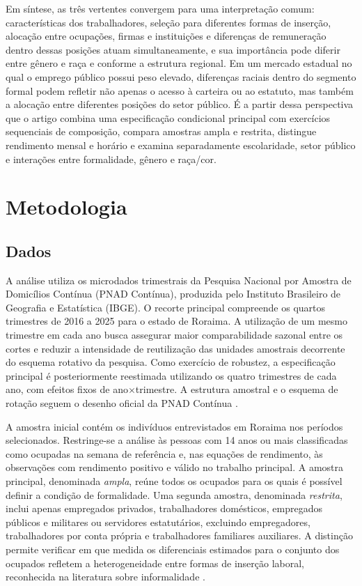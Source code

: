 \documentclass[12pt,a4paper]{article}
\begin{document}
Em síntese, as três vertentes convergem para uma interpretação comum: características
dos trabalhadores, seleção para diferentes formas de inserção, alocação entre ocupações,
firmas e instituições e diferenças de remuneração dentro dessas posições atuam
simultaneamente, e sua importância pode diferir entre gênero e raça e conforme a
estrutura regional. Em um mercado estadual no qual o emprego público possui peso elevado,
diferenças raciais dentro do segmento formal podem refletir não apenas o acesso à carteira
ou ao estatuto, mas também a alocação entre diferentes posições do setor público. É a
partir dessa perspectiva que o artigo combina uma especificação condicional principal com
exercícios sequenciais de composição, compara amostras ampla e restrita, distingue
rendimento mensal e horário e examina separadamente escolaridade, setor público e
interações entre formalidade, gênero e raça/cor.

\section{Metodologia}
\label{sec:metodologia}

\subsection{Dados}
\label{subsec:dados}

A análise utiliza os microdados trimestrais da Pesquisa Nacional por Amostra de
Domicílios Contínua (PNAD Contínua), produzida pelo Instituto Brasileiro de
Geografia e Estatística (IBGE). O recorte principal compreende os quartos
trimestres de 2016 a 2025 para o estado de Roraima. A utilização de um mesmo
trimestre em cada ano busca assegurar maior comparabilidade sazonal entre os
cortes e reduzir a intensidade de reutilização das unidades amostrais decorrente
do esquema rotativo da pesquisa. Como exercício de robustez, a especificação
principal é posteriormente reestimada utilizando os quatro trimestres de
cada ano, com efeitos fixos de ano$\times$trimestre. A estrutura amostral e o
esquema de rotação seguem o desenho oficial da PNAD Contínua
\citep{ibge_pnadc_notas_metodologicas}.

A amostra inicial contém os indivíduos entrevistados em Roraima nos períodos
selecionados. Restringe-se a análise às pessoas com 14 anos ou mais
classificadas como ocupadas na semana de referência e, nas equações de
rendimento, às observações com rendimento positivo e válido no trabalho
principal. A amostra principal, denominada \textit{ampla}, reúne todos os
ocupados para os quais é possível definir a condição de formalidade. Uma segunda
amostra, denominada \textit{restrita}, inclui apenas empregados privados,
trabalhadores domésticos, empregados públicos e militares ou servidores
estatutários, excluindo empregadores, trabalhadores por conta própria e
trabalhadores familiares auxiliares. A distinção permite verificar em que
medida os diferenciais estimados para o conjunto dos ocupados refletem a
heterogeneidade entre formas de inserção laboral, reconhecida na literatura
sobre informalidade \citep{bargain2011,hirata2010b}.
\end{document}

